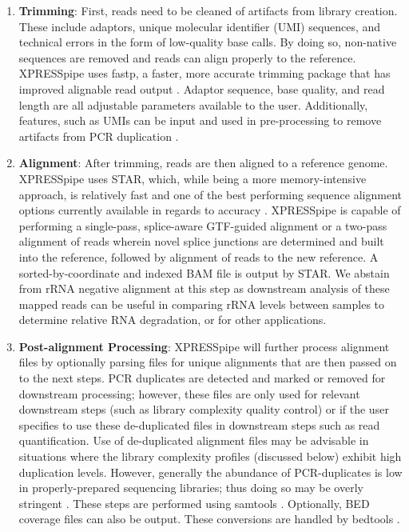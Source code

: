 \documentclass[11pt, a4paper, oneside]{article}
\begin{document}
\begin{enumerate}
  \item \textbf{Trimming}: First, reads need to be cleaned of artifacts from library creation. These include adaptors, unique molecular identifier (UMI) sequences, and technical errors in the form of low-quality base calls. By doing so, non-native sequences are removed and reads can align properly to the reference. XPRESSpipe uses fastp, a faster, more accurate trimming package that has improved alignable read output \cite{fastp}. Adaptor sequence, base quality, and read length are all adjustable parameters available to the user. Additionally, features, such as UMIs can be input and used in pre-processing to remove artifacts from PCR duplication \cite{umi}.
  \item \textbf{Alignment}: After trimming, reads are then aligned to a reference genome. XPRESSpipe uses STAR, which, while being a more memory-intensive approach, is relatively fast and one of the best performing sequence alignment options currently available in regards to accuracy \cite{star, baruzzo_natmeth}. XPRESSpipe is capable of performing a single-pass, splice-aware GTF-guided alignment or a two-pass alignment of reads wherein novel splice junctions are determined and built into the reference, followed by alignment of reads to the new reference. A sorted-by-coordinate and indexed BAM file is output by STAR. We abstain from rRNA negative alignment at this step as downstream analysis of these mapped reads can be useful in comparing rRNA levels between samples to determine relative RNA degradation, or for other applications.
  \item \textbf{Post-alignment Processing}: XPRESSpipe will further process alignment files by optionally parsing files for unique alignments that are then passed on to the next steps. PCR duplicates are detected and marked or removed for downstream processing; however, these files are only used for relevant downstream steps (such as library complexity quality control) or if the user specifies to use these de-duplicated files in downstream steps such as read quantification. Use of de-duplicated alignment files may be advisable in situations where the library complexity profiles (discussed below) exhibit high duplication levels. However, generally the abundance of PCR-duplicates is low in properly-prepared sequencing libraries; thus doing so may be overly stringent \cite{umi}. These steps are performed using samtools \cite{samtools}. Optionally, BED coverage files can also be output. These conversions are handled by bedtools \cite{bedtools}.

\end{enumerate}
\end{document}
